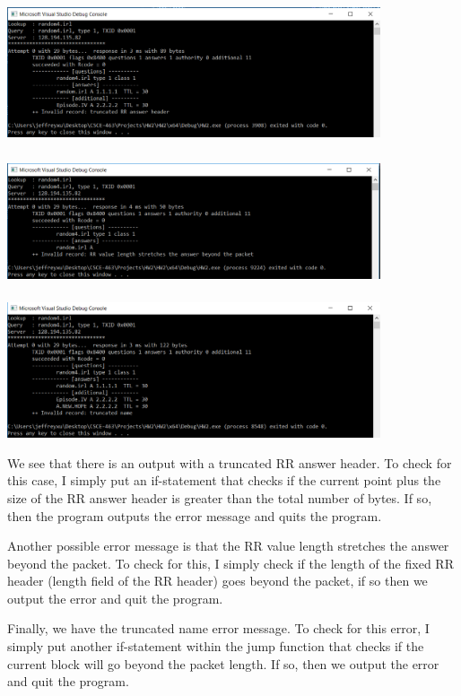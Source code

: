\documentclass[12pt]{article}
\begin{document}
\begin{center}
\includegraphics[width=11cm, height=4cm]{random4.irlTruncatedRR}
\end{center}
\begin{center}
\includegraphics[width=11cm, height=3.8cm]{random4.irlRRLength}
\end{center}
\begin{center}
\includegraphics[width=11cm, height=4cm]{random4.irlTrancatedName}
\end{center}

We see that there is an output with a truncated RR answer header. To check for this case, I simply put an if-statement that checks if the current point plus the size of the RR answer header is greater than the total number of bytes. If so, then the program outputs the error message and quits the program. 

Another possible error message is that the RR value length stretches the answer beyond the packet. To check for this, I simply check if the length of the fixed RR header (length field of the RR header) goes beyond the packet, if so then we output the error and quit the program. 

Finally, we have the truncated name error message. To check for this error, I simply put another if-statement within the jump function that checks if the current block will go beyond the packet length. If so, then we output the error and quit the program. 
\end{document}
